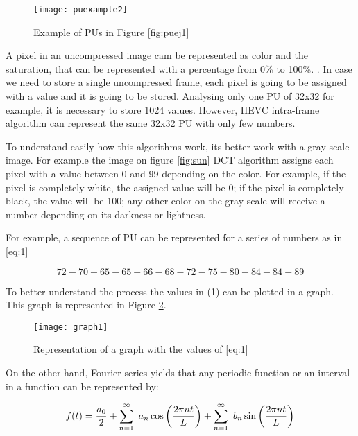 \documentclass[10pt,journal,compsoc]{IEEEtran}
\begin{document}
\begin{figure}[h!]
\texttt{[image: puexample2]}
\caption{Example of PUs in Figure \ref{fig:puej1}}
\label{fig:puej2}
\end{figure}




A pixel in an uncompressed image cam be represented as color and the saturation, that can be represented with a percentage from 0\% to 100\%. \cite{color}. In case we need to store a single uncompressed frame, each pixel is going to be assigned with a value and it is going to be stored. Analysing only one PU of 32x32 for example, it is necessary to store 1024 values. However, HEVC intra-frame algorithm can represent the same 32x32 PU with only few numbers.

To understand easily how this algorithms work, its better work with a gray scale image. For example the image on figure \ref{fig:sun} DCT algorithm assigns each pixel with a value between 0 and 99 depending on the color. For example, if the pixel is completely white, the assigned value will be 0; if the pixel is completely black, the value will be 100; any other color on the gray scale will receive a number depending on its darkness or lightness. \cite{jpeg} 



For example, a sequence of PU can be represented for a series of numbers as in \eqref{eq:1}

\begin{equation}
 72-70-65-65-66-68-72-75-80-84-84-89\label{eq:1}
\end{equation}
\cite{jpeg}
 

To better understand the process the values in (1) can be plotted in a graph. This graph is represented in Figure \ref{fig:graph1}.


\begin{figure}[h]
\texttt{[image: graph1]}
\caption{Representation of a graph with the values of \eqref{eq:1}}
\label{fig:graph1}
\end{figure}

On the other hand, Fourier series yields that any periodic function or an interval in a function can be represented by:

\begin{equation}
f(t)={a_0\over2}+\sum_{n=1}^\infty ~a_n \cos\left({2\pi n t\over L}\right)+\sum_{n=1}^\infty ~b_n \sin\left({2\pi n t\over L}\right)\label{eq:furier}
\end{equation}
\end{document}
